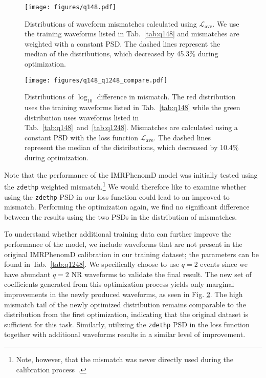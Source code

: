\documentclass[twocolumn]{aastex631}
\newcommand{\zdethp}{\texttt{zdethp}}
\begin{document}
\begin{figure}[t]
	\centering
	\texttt{[image: figures/q148.pdf]}
	\caption{Distributions of waveform mismatches calculated using 
	$\mathcal{L}_{\mathrm{ave}}$. We use the training waveforms listed in 
	Tab.~\ref{tab:q148} and	mismatches are weighted with a constant PSD. 
	The dashed lines represent the median of the distributions, which decreased by 45.3\% during optimization.}
	\label{fig:q148}
\end{figure}
\begin{figure}[t]
	\centering
	\texttt{[image: figures/q148\_q1248\_compare.pdf]}
	\caption{Distributions of $\log_{10}$ difference in mismatch. The red
	distribution uses the training waveforms listed in
	Tab.~\ref{tab:q148} while the green distribution uses waveforms
	listed in Tab.~\ref{tab:q148}~and~\ref{tab:q1248}. Mismatches are calculated
	using a constant PSD with the loss function $\mathcal{L}_{\mathrm{ave}}$. 
	The dashed lines represent the median of the distributions, which decreased by 10.4\% during optimization.}
	\label{fig:q148_q1248_compare}
\end{figure}

Note that the performance of the IMRPhenomD model was initially tested using the
{\zdethp} weighted mismatch.\footnote{
	Note, however, that the mismatch was never directly used during the calibration process~\citep{khan2016frequency, khan2019phenomenological}.
} We would therefore like to examine whether using the {\zdethp} PSD in our loss function
could lead to an improved to mismatch. Performing the optimization again, we find no significant difference
between the results using the two PSDs in the distribution of mismatches.

To understand whether additional training data can further improve the
performance of the model, we include waveforms that are not present in the
original IMRPhenomD calibration in our training dataset; the parameters
can be found in Tab.~\ref{tab:q1248}. We specifically choose to use $q=2$ events
since we have abundant $q=2$ NR waveforms to validate the final result. The new
set of coefficients generated from this optimization process yields only
marginal improvements in the newly produced waveforms, as seen in Fig.
\ref{fig:q148_q1248_compare}. The high mismatch tail of the newly optimized
distribution remains comparable to the distribution from the first optimization, indicating that
the original dataset is sufficient for this task. Similarly, utilizing the
{\zdethp} PSD in the loss function together with additional waveforms results in a
similar level of improvement.
\end{document}
